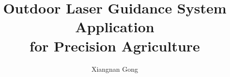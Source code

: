 \documentclass[ece,dissertation]{puthesis}
\title{Outdoor Laser Guidance System Application\\
  for Precision Agriculture}
\author{Xiangnan Gong}{Gong, Xiangnan}
\begin{document}
\volume




















%



%



%
\end{document}
